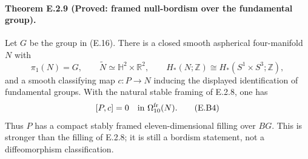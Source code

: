 \paragraph{Theorem E.2.9 (Proved: framed null-bordism over the fundamental group).}
Let $G$ be the group in (E.16). There is a closed smooth
aspherical four-manifold $N$ with
\[
 \pi_1(N)=G,\qquad \widetilde N\simeq\mathbb H^2\times\mathbb R^2,
 \qquad H_*(N;\mathbb Z)\cong H_*(S^1\times S^3;\mathbb Z),
 \tag{E.B3}
\]
and a smooth classifying map $c:P\to N$ inducing the displayed
identification of fundamental groups. With the natural stable
framing of E.2.8, one has
\[
                 [P,c]=0\quad\hbox{in }\Omega^{\mathrm{fr}}_{10}(N).
 \tag{E.B4}
\]
Thus $P$ has a compact stably framed eleven-dimensional filling
over $BG$. This is stronger than the filling of E.2.8; it is
still a bordism statement, not a diffeomorphism classification.
